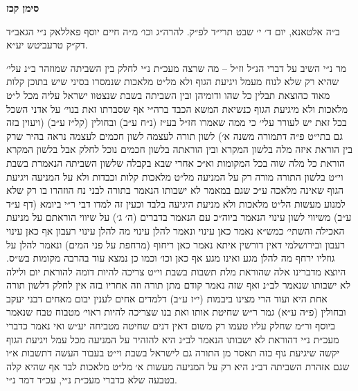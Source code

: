 \documentclass[12pt, openany]{book}
\newcommand{\chapname}{}
\newcommand{\newchap}[1]{
	\addcontentsline{toc}{chapter}{#1}
	\renewcommand{\chapname}{#1}
		\begin{center}
			\textbf{%
\fontsize{16pt}{16pt}\selectfont
				#1}
		\end{center}
}
\begin{document}
\newchap{סימן קכז}
\begin{multicols}{2}
ב״ה אלטאנא, יום ד׳ י׳ שבט תרי״ד לפ״ק. להרה״ג וכו׳ מ״ה חיים יוסף פאללאק נ״י הגאב״ד דק״ק טרעביטש יע״א.\\\vspace{0pt}

מר נ״י השיב על דברי הנ״ל וז״ל – מה שרצה מעכ״ת נ״י לחלק בין השביתה שמוזהר ב״נ עלי׳ שהיא רק שלא לנוח מעמל ויגיעת הגוף ולא מל״ט מלאכות שנמסרו בסיני שיש בתוכן קלות מאוד כהוצאת תבלין כל שהו ודומיהן ובין השביתה בשבת שנצטוו ישראל עליה מכל ל״ט מלאכות ולא מיגיעת הגוף כנשיאת המשא הכבד ברה״י אף שסברתו זאת בנוי׳ על אדני השכל בכל זאת יש לעורר עלי׳ כי ממה שאמרו חז״ל בע״ז (נ״ח ע״ב) ובחולין (קל״ז ע״ב) (ויעוין בזה גם בתי״ט פ״ה דתמורה משנה א׳) לשון תורה לעצמה לשון חכמים לעצמה נראה בהיר שרק בין הוראת איזה מלה בלשון המקרא ובין הוראתה בלשון חכמים נוכל לחלק אבל בלשון המקרא הוראת כל מלה שוה בכל המקומות וא״כ אחרי שבא בקבלה שלשון השביתה הנאמרת בשבת וי״ט בלשון התורה מורה רק על המניעה מל״ט מלאכות קלות וכבדות ולא על המניעה ויגיעת הגוף שאינה מלאכה ע״כ שגם במאמר לא ישבותו הנאמר בתורה לבני נח הוזהרו בו רק שלא למנוע מעשות הל״ט מלאכות ולא מניעת היגיעה בלבד וכעין זה למדו דבי ר״י ביומא (דף ע״ד ע״ב) משיווי לשון עינוי הנאמר ביוה״כ עם הנאמר בדברים (ה׳ ג׳) על שיווי הוראתם על מניעת האכילה והשתי׳ כמש״א נאמר כאן עינוי ונאמר להלן עינוי מה להלן עינוי רעבון אף כאן עינוי רעבון ובירושלמי דאין דורשין איתא נאמר כאן ריחוף (מרחפת על פני המים) ונאמר להלן על גוזליו ירחף מה להלן מגע ואינו מגע אף כאן וכו׳ וכמו כן נמצא עוד בהרבה מקומות בש״ס. היוצא מדברינו אלה שהוראת מלת תשבות בשבת וי״ט צריכה להיות דומה להוראת יום ולילה לא ישבותו שנאמר לב״נ ואף שזה נאמר קודם מתן תורה וזה אחריו בזה אין לחלק דלשון תורה אחת היא ועוד הרי מצינו ביבמות (י״ז ע״ב) דלמדים אחים לענין יבום מאחים דבני יעקב ובחולין (פ״ה ע״א) גמר ר״ש שחיטת אותו ואת בנו שצריכה להיות ראוי׳ מטבוח טבח שנאמר ביוסף ור״מ שחלק עליו טעמו רק משום דאין דנים שחיטה מטביחה יע״ש ואי נאמר כדברי מעכ״ת נ״י דהוראת לא ישבותו הנאמר לב״נ היא להזהיר על המניעה מכל עמל ויגיעת הגוף יקשה שיגיעת גוף כזה תאסר מן התורה גם לישראל בשבת וי״ט בעבור העשה דתשבות א״ו שגם אזהרת השביתה דב״נ היא רק על המניעה מעשות א׳ מל״ט מלאכות לבד אף שהיא קלה בטבעה שלא כדברי מעכ״ת נ״י, עכ״ד דמר נ״י.\\\vspace{0pt}


\end{multicols}
\end{document}
